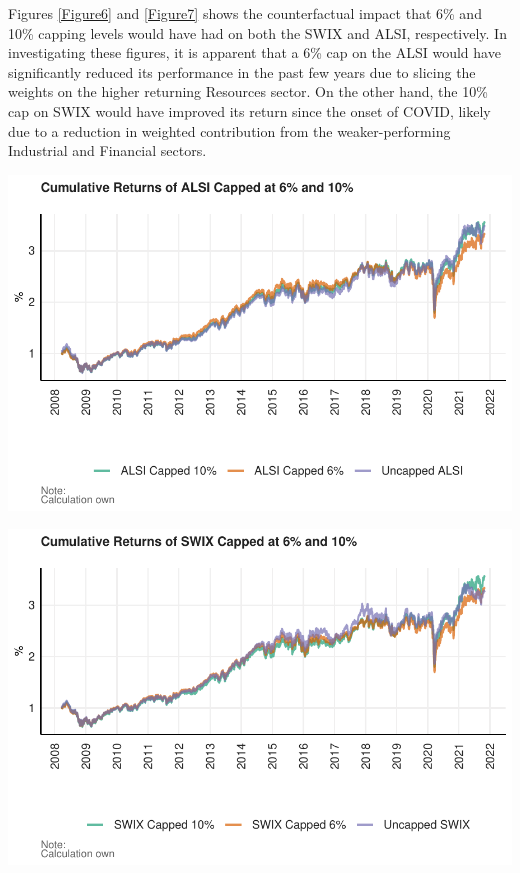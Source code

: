 \documentclass[11pt,preprint, authoryear]{elsarticle}
\let\origfigure\figure
\let\endorigfigure\endfigure
\renewenvironment{figure}[1][2] {
    \expandafter\origfigure\expandafter[H]
} {
    \endorigfigure
}
\numberwithin{equation}{section}
\numberwithin{figure}{section}
\numberwithin{table}{section}
\begin{document}
Figures \ref{Figure6} and \ref{Figure7} shows the counterfactual impact
that 6\% and 10\% capping levels would have had on both the SWIX and
ALSI, respectively. In investigating these figures, it is apparent that
a 6\% cap on the ALSI would have significantly reduced its performance
in the past few years due to slicing the weights on the higher returning
Resources sector. On the other hand, the 10\% cap on SWIX would have
improved its return since the onset of COVID, likely due to a reduction
in weighted contribution from the weaker-performing Industrial and
Financial sectors.

\begin{figure}[H]

{\centering \includegraphics{Question3_files/figure-latex/ALSI capping plot-1} 

}

\caption{Cumulative Returns of ALSI Capped at 6 and 10 Percent. \label{Figure6}}\label{fig:ALSI capping plot}
\end{figure}

\begin{figure}[H]

{\centering \includegraphics{Question3_files/figure-latex/SWIX capping plot-1} 

}

\caption{Cumulative Returns of SWIX Capped at 6 and 10 Percent. \label{Figure7}}\label{fig:SWIX capping plot}
\end{figure}
\end{document}
